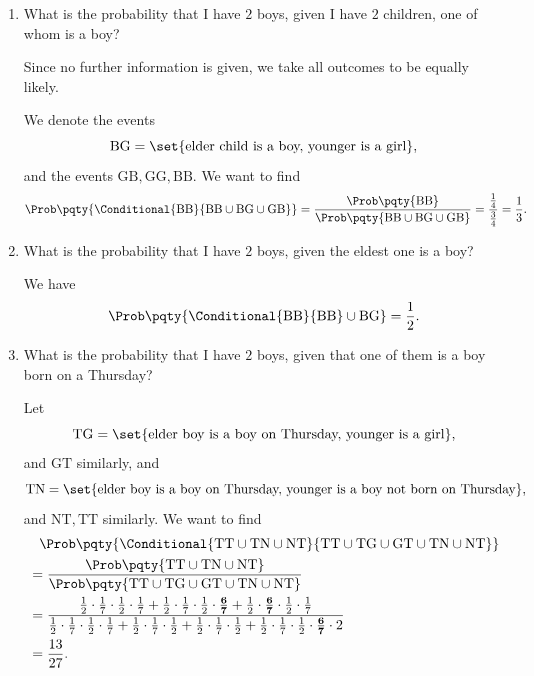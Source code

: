 \begin{example}
    \label{ex:children-thursday}%
    \begin{enumerate}
        \item What is the probability that I have \(2\) boys, given I have \(2\) children, one of whom is a boy?
    
            Since no further information is given, we take all outcomes to be equally likely.

            We denote the events
            \[
                \mathrm{BG} = \set{\text{elder child is a boy, younger is a girl}},
            \]
            and the events \(\mathrm{GB}, \mathrm{GG}, \mathrm{BB}\). We want to find
            \[
                \Prob\pqty{\Conditional{\mathrm{BB}}{\mathrm{BB} \cup \mathrm{BG} \cup \mathrm{GB}}} = \frac{\Prob\pqty{\mathrm{BB}}}{\Prob\pqty{\mathrm{BB} \cup \mathrm{BG} \cup \mathrm{GB}}} = \frac{\frac{1}{4}}{\frac{3}{4}} = \frac{1}{3}.
            \]

        \item What is the probability that I have \(2\) boys, given the eldest one is a boy?
        
            We have
            \[
                \Prob\pqty{\Conditional{\mathrm{BB}}{\mathrm{BB}} \cup \mathrm{BG}} = \frac{1}{2}.
            \]

        \item What is the probability that I have \(2\) boys, given that one of them is a boy born on a Thursday?
        
        Let
        \[
            \mathrm{TG} = \set{\text{elder boy is a boy on Thursday, younger is a girl}},
        \]
        and \(\mathrm{GT}\) similarly, and
        \[
            \mathrm{TN} = \set{\text{elder boy is a boy on Thursday, younger is a boy not born on Thursday}},
        \]
        and \(\mathrm{NT, TT}\) similarly. We want to find
        \begin{align*}
            &\phantom{=} \Prob\pqty{\Conditional{\mathrm{TT} \cup \mathrm{TN} \cup \mathrm{NT}}{\mathrm{TT} \cup \mathrm{TG} \cup \mathrm{GT} \cup \mathrm{TN} \cup \mathrm{NT}}} \\
            &= \frac{\Prob\pqty{\mathrm{TT} \cup \mathrm{TN} \cup \mathrm{NT}}}{\Prob\pqty{\mathrm{TT} \cup \mathrm{TG} \cup \mathrm{GT} \cup \mathrm{TN} \cup \mathrm{NT}}} \\
            &= \frac{\frac{1}{2} \cdot \frac{1}{7} \cdot \frac{1}{2} \cdot \frac{1}{7} + \frac{1}{2} \cdot \frac{1}{7} \cdot \frac{1}{2} \cdot \mathbf{\frac{6}{7}} + \frac{1}{2} \cdot \mathbf{\frac{6}{7}} \cdot \frac{1}{2} \cdot \frac{1}{7}}{\frac{1}{2} \cdot \frac{1}{7} \cdot \frac{1}{2} \cdot \frac{1}{7} + \frac{1}{2} \cdot \frac{1}{7} \cdot \frac{1}{2} + \frac{1}{2} \cdot \frac{1}{7} \cdot \frac{1}{2} + \frac{1}{2} \cdot \frac{1}{7} \cdot \frac{1}{2} \cdot \mathbf{\frac{6}{7}} \cdot 2}
 \\
            &= \frac{13}{27}.
        \end{align*}
    \end{enumerate}
\end{example}

